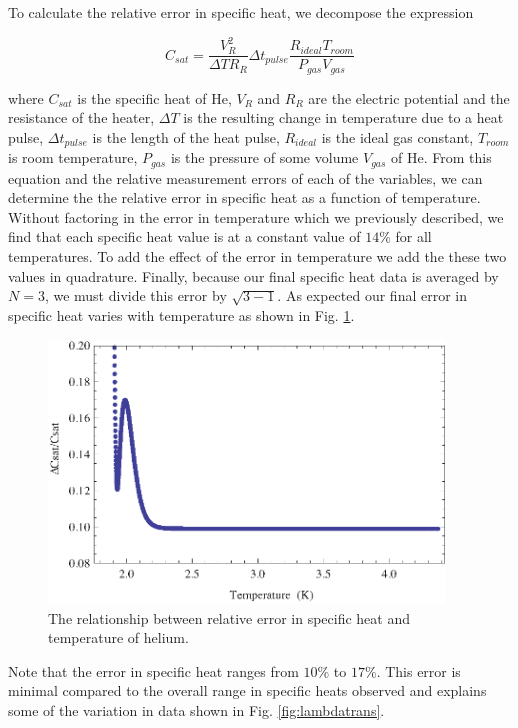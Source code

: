 To calculate the relative error in specific heat, we decompose the expression 

\begin{center}
\begin{equation}
C_{sat}=\frac{V_{R}^{2}}{\Delta T R_{R}}\Delta t_{pulse} \frac{R_{ideal}T_{room}}{P_{gas}V_{gas}}
\end{equation}
\end{center}

where $C_{sat}$ is the specific heat of He, $V_{R}$ and $R_{R}$ are the electric potential and the resistance of the heater, $\Delta T$ is the resulting change in temperature due to a heat pulse, $\Delta t_{pulse}$ is the length of the heat pulse, $R_{ideal}$ is the ideal gas constant, $T_{room}$ is room temperature, $P_{gas}$ is the pressure of some volume $V_{gas}$ of He.  From this equation and the relative measurement errors of each of the variables, we can determine the the relative error in specific heat as a function of temperature.  Without factoring in the error in temperature which we previously described, we find that each specific heat value is at a constant value of $14\%$ for all temperatures.  To add the effect of the error in temperature we add the these two values in quadrature.  Finally, because our final specific heat data is averaged by $N=3$, we must divide this error by $\sqrt{3-1}$. As expected our final error in specific heat varies with temperature as shown in Fig. \ref{fig:heatcaperror}.

\begin{figure}[htbp]
\begin{center}
\includegraphics[height=70mm]{./figures/heatcaperror.eps}
\caption{\small{The relationship between relative error in specific heat and temperature of helium.}}
\label{fig:heatcaperror}
\end{center}
\end{figure}

Note that the error in specific heat ranges from $10\%$ to $17\%$.  This error is minimal compared to the overall range in specific heats observed and explains some of the variation in data shown in Fig. \ref{fig:lambdatrans}.